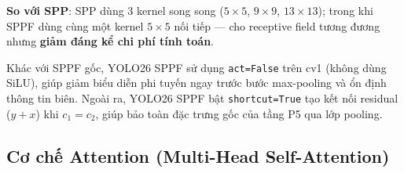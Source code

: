 \textbf{So với SPP}: SPP dùng 3 kernel song song ($5\times5$, $9\times9$, $13\times13$); trong khi SPPF dùng cùng một kernel $5\times5$ nối tiếp --- cho receptive field tương đương nhưng \textbf{giảm đáng kể chi phí tính toán}.

\begin{notebox}[Lưu ý: YOLO26 SPPF có act=False và shortcut=True]
Khác với SPPF gốc, YOLO26 SPPF sử dụng \texttt{act=False} trên cv1 (không dùng SiLU), giúp giảm biểu diễn phi tuyến ngay trước bước max-pooling và ổn định thông tin biên. Ngoài ra, YOLO26 SPPF bật \texttt{shortcut=True} tạo kết nối residual ($y + x$) khi $c_1 = c_2$, giúp bảo toàn đặc trưng gốc của tầng P5 qua lớp pooling.
\end{notebox}

\subsection{Cơ chế Attention (Multi-Head Self-Attention)}
\label{subsec:attention}

